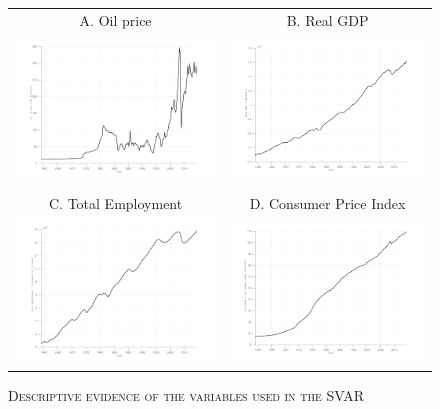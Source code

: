 \documentclass[11pt,a4paper]{article}
\begin{document}
\begin{figure}[H]
	\begin{center}
		\caption{\textsc{Descriptive evidence of the variables used in the SVAR}}\label{fig:descriptive}
		\begin{tabular}{cc}
			
			A. Oil price & B. Real GDP \\
			\includegraphics[width=7.5cm]{Figures/Descriptive_oil} &  \includegraphics[width=7.5cm]{Figures/Descriptive_GDP} \\
			&\\
			C. Total Employment & D. Consumer Price Index \\
			\includegraphics[width=7.5cm]{Figures/Descriptive_TOTEMP} & \includegraphics[width=7.5cm]{Figures/Descriptive_PCEPI} \\

\end{tabular}
\end{center}
\end{figure}
\end{document}
